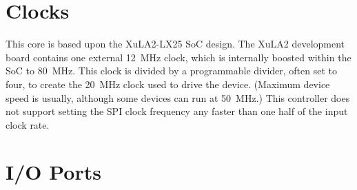 \documentclass{gqtekspec}
\begin{document}
\chapter{Clocks}\label{ch:clk}

This core is based upon the XuLA2-LX25 SoC design.  The XuLA2 development board
contains one external 12~MHz clock, which is internally boosted within the SoC
to 80~MHz.  This clock is divided by a programmable divider, often set to 
four, to create the 20~MHz clock used to drive the device.  (Maximum device
speed is usually, although some devices can run at 50~MHz.)   This
controller does not support setting the SPI clock frequency any faster than
one half of the input clock rate.

\chapter{I/O Ports}\label{ch:io}
\end{document}
